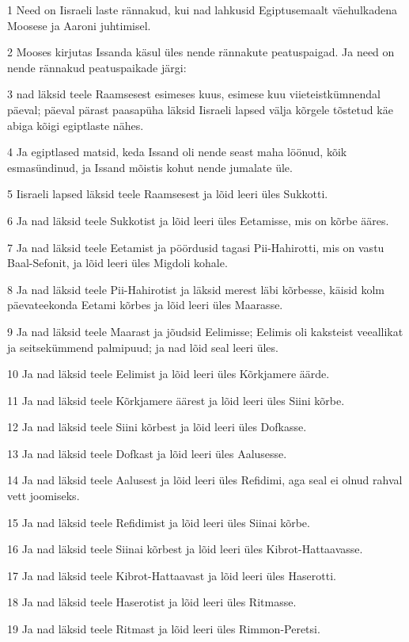 \par 1 Need on Iisraeli laste rännakud, kui nad lahkusid Egiptusemaalt väehulkadena Moosese ja Aaroni juhtimisel.
\par 2 Mooses kirjutas Issanda käsul üles nende rännakute peatuspaigad. Ja need on nende rännakud peatuspaikade järgi:
\par 3 nad läksid teele Raamsesest esimeses kuus, esimese kuu viieteistkümnendal päeval; päeval pärast paasapüha läksid Iisraeli lapsed välja kõrgele tõstetud käe abiga kõigi egiptlaste nähes.
\par 4 Ja egiptlased matsid, keda Issand oli nende seast maha löönud, kõik esmasündinud, ja Issand mõistis kohut nende jumalate üle.
\par 5 Iisraeli lapsed läksid teele Raamsesest ja lõid leeri üles Sukkotti.
\par 6 Ja nad läksid teele Sukkotist ja lõid leeri üles Eetamisse, mis on kõrbe ääres.
\par 7 Ja nad läksid teele Eetamist ja pöördusid tagasi Pii-Hahirotti, mis on vastu Baal-Sefonit, ja lõid leeri üles Migdoli kohale.
\par 8 Ja nad läksid teele Pii-Hahirotist ja läksid merest läbi kõrbesse, käisid kolm päevateekonda Eetami kõrbes ja lõid leeri üles Maarasse.
\par 9 Ja nad läksid teele Maarast ja jõudsid Eelimisse; Eelimis oli kaksteist veeallikat ja seitsekümmend palmipuud; ja nad lõid seal leeri üles.
\par 10 Ja nad läksid teele Eelimist ja lõid leeri üles Kõrkjamere äärde.
\par 11 Ja nad läksid teele Kõrkjamere äärest ja lõid leeri üles Siini kõrbe.
\par 12 Ja nad läksid teele Siini kõrbest ja lõid leeri üles Dofkasse.
\par 13 Ja nad läksid teele Dofkast ja lõid leeri üles Aalusesse.
\par 14 Ja nad läksid teele Aalusest ja lõid leeri üles Refidimi, aga seal ei olnud rahval vett joomiseks.
\par 15 Ja nad läksid teele Refidimist ja lõid leeri üles Siinai kõrbe.
\par 16 Ja nad läksid teele Siinai kõrbest ja lõid leeri üles Kibrot-Hattaavasse.
\par 17 Ja nad läksid teele Kibrot-Hattaavast ja lõid leeri üles Haserotti.
\par 18 Ja nad läksid teele Haserotist ja lõid leeri üles Ritmasse.
\par 19 Ja nad läksid teele Ritmast ja lõid leeri üles Rimmon-Peretsi.

